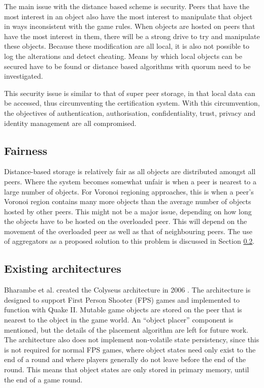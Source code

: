 The main issue with the distance based scheme is security. Peers that have the most interest in an object also have the most interest to manipulate that object in ways inconsistent with the game rules. When objects are hosted on peers that have the most interest in them, there will be a strong drive to try and manipulate these objects. Because these modification are all local, it is also not possible to log the alterations and detect cheating. Means by which local objects can be secured have to be found or distance based algorithms with quorum need to be investigated.

This security issue is similar to that of super peer storage, in that local data can be accessed, thus circumventing the certification system. With this circumvention, the objectives of authentication, authorisation, confidentiality, trust, privacy and identity management are all compromised.

\subsection{Fairness}

Distance-based storage is relatively fair as all objects are distributed amongst all peers. Where the system becomes somewhat unfair is when a peer is nearest to a large number of objects. For Voronoi regioning approaches, this is when a peer's Voronoi region contains many more objects than the average number of objects hosted by other peers. This might not be a major issue, depending on how long the objects have to be hosted on the overloaded peer. This will depend on the movement of the overloaded peer as well as that of neighbouring peers. The use of aggregators as a proposed solution to this problem is discussed in Section \ref{distance_based_existing_archs}.

\subsection{Existing architectures}
\label{distance_based_existing_archs}

Bharambe et al. created the Colyseus architecture in 2006 \cite{colyseus_distance_based}. The architecture is designed to support First Person Shooter (FPS) games and implemented to function with Quake II. Mutable game objects are stored on the peer that is nearest to the object in the game world. An ``object placer'' component is mentioned, but the details of the placement algorithm are left for future work. The architecture also does not implement non-volatile state persistency, since this is not required for normal FPS games, where object states need only exist to the end of a
round and where players generally do not leave before the end of the round. This means that object states are only stored in primary memory, until the end of a game round.

